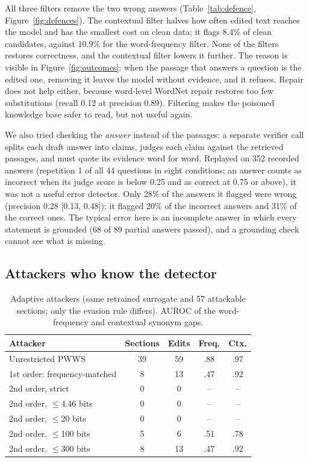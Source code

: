 \documentclass[10pt,journal,compsoc]{IEEEtran}
\begin{document}
All three filters remove the two wrong answers (Table~\ref{tab:defence}, Figure~\ref{fig:defences}). The contextual filter halves how often edited text reaches the model and has the smallest cost on clean data; it flags 8.4\% of clean candidates, against 10.9\% for the word-frequency filter. None of the filters restores correctness, and the contextual filter lowers it further. The reason is visible in Figure~\ref{fig:outcomes}: when the passage that answers a question is the edited one, removing it leaves the model without evidence, and it refuses. Repair does not help either, because word-level WordNet repair restores too few substitutions (recall 0.12 at precision 0.89). Filtering makes the poisoned knowledge base safer to read, but not useful again.

We also tried checking the \emph{answer} instead of the passages: a separate verifier call splits each draft answer into claims, judges each claim against the retrieved passages, and must quote its evidence word for word. Replayed on 352 recorded answers (repetition 1 of all 44 questions in eight conditions; an answer counts as incorrect when its judge score is below 0.25 and as correct at 0.75 or above), it was not a useful error detector. Only 28\% of the answers it flagged were wrong (precision 0.28 [0.13, 0.48]); it flagged 20\% of the incorrect answers and 31\% of the correct ones. The typical error here is an incomplete answer in which every statement is grounded (68 of 89 partial answers passed), and a grounding check cannot see what is missing.

\subsection{Attackers who know the detector}\label{sec:adaptive}
\begin{table}[t]
\caption{Adaptive attackers (same retrained surrogate and 57 attackable sections; only the evasion rule differs). AUROC of the word-frequency and contextual synonym gaps.}\label{tab:adaptive}
\centering\small
\setlength{\tabcolsep}{3pt}
\begin{tabular}{@{}lcccc@{}}
\toprule
Attacker & Sections & Edits & Freq. & Ctx.\\
\midrule
Unrestricted PWWS & 39 & 59 & .88 & .97\\
1st order: frequency-matched & 8 & 13 & .47 & .92\\
2nd order, strict & 0 & 0 & -- & --\\
2nd order, $\le$4.46 bits & 0 & 0 & -- & --\\
2nd order, $\le$20 bits & 0 & 0 & -- & --\\
2nd order, $\le$100 bits & 5 & 6 & .51 & .78\\
2nd order, $\le$300 bits & 8 & 13 & .47 & .92\\
\bottomrule
\end{tabular}
\end{table}
\end{document}
